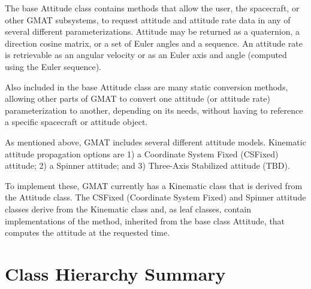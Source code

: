The base Attitude class contains methods that allow the user, the spacecraft, or other GMAT subsystems, to request attitude and attitude rate data in any of several different parameterizations.  Attitude may be returned as a quaternion, a direction cosine matrix, or a set of Euler angles and a sequence.  An attitude rate is retrievable as an angular velocity or as an Euler axis and angle (computed using the Euler sequence).

Also included in the base Attitude class are many static conversion methods, allowing other parts of GMAT to convert one attitude (or attitude rate) parameterization to another, depending on its needs, without having to reference a specific spacecraft or attitude object.

As mentioned above, GMAT includes several different attitude models.  Kinematic attitude propagation options are 1) a Coordinate System Fixed (CSFixed) attitude; 2) a Spinner attitude; and 3) Three-Axis Stabilized attitude (TBD).

To implement these, GMAT currently has a Kinematic class that is derived from the Attitude class.  The CSFixed (Coordinate System Fixed) and Spinner attitude classes derive from the Kinematic class and, as leaf classes, contain implementations of the method, inherited from the base class Attitude, that computes the attitude at the requested time.

\section{Class Hierarchy Summary}

